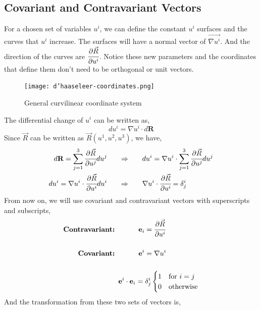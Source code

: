 \subsection{Covariant and Contravariant Vectors}

For a chosen set of variables $u^i$, we can define the constant $u^i$ surfaces and the curves that $u^i$ increase. The surfaces will have a normal vector of $\Vec{\nabla u^i}$. And the direction of the curves are $\cfrac{\partial \Vec{R}}{\partial u^i}$. Notice these new parameters and the coordinates that define them don't need to be orthogonal or unit vectors.
\begin{figure}[H]
    \centering
    \texttt{[image: d'haaseleer-coordinates.png]}
    \caption{General curvilinear coordinate system \cite{dhaeseleer_flux_2012}}
\end{figure}
The differential change of $u^i$ can be written as,
\begin{equation}
    du^i = \nabla u^i \cdot d\textbf{R}
\end{equation}
Since $\Vec{R}$ can be written as $\Vec{R}(u^1, u^2, u^3)$, we have,
\begin{align}
    d\textbf{R} = \sum_{j=1}^3 \cfrac{\partial \Vec{R}}{\partial u^j}du^j \hspace{.6cm} &\Rightarrow \hspace{.6cm} du^i = \nabla u^i \cdot \sum_{j=1}^3 \cfrac{\partial \Vec{R}}{\partial u^j}du^j \\
    du^i = \nabla u^i \cdot \cfrac{\partial \Vec{R}}{\partial u^i}du^i \hspace{.6cm} &\Rightarrow \hspace{.6cm} \nabla u^i \cdot \cfrac{\partial \Vec{R}}{\partial u^i} = \delta_j^i
\end{align}
From now on, we will use covariant and contravariant vectors with superscripts and subscripts,
\begin{align}
    \textbf{Contravariant: }& \hspace{1cm} \mathbf{e}_i = \cfrac{\partial \Vec{R}}{\partial u^i} \\[.5cm]
    \textbf{Covariant: }& \hspace{1cm} \mathbf{e}^i = \nabla u^i \\[.5cm]
    &\mathbf{e}^i \cdot \mathbf{e}_i = \delta_j^i \begin{cases}
        1 &\text{for } i=j\\
        0 &\text{otherwise}
    \end{cases}
\end{align}
And the transformation from these two sets of vectors is,
